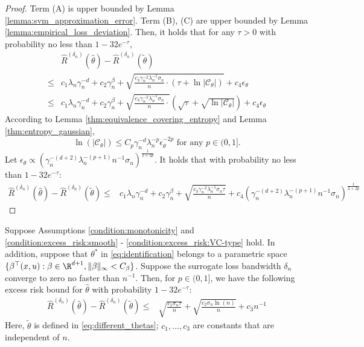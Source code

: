 \begin{proof}
Term (A) is upper bounded by Lemma \ref{lemma:svm_approximation_error}. Term (B), (C) are upper bounded by Lemma \ref{lemma:empirical_loss_deviation}. Then, it holds that for any $\tau>0$ with probability no less than $1-32e^{-\tau}$,
\begin{align*}
   &\widehat R^{({\delta_n})}(\widehat\theta) - \widehat R^{({\delta_n})}(\tilde\theta)\\
   \leq & c_1 \lambda_n\gamma_n^{-d} + c_2\gamma_n^{\beta} + \sqrt{\frac{ c_3\gamma_n^{-2}\lambda_n^{-1}\sigma_n}{n}\cdot\left(\tau +\ln|\mathcal{C}_\theta|\right)} + c_4\epsilon_\theta \\
   \leq & c_1 \lambda_n\gamma_n^{-d} + c_2\gamma_n^{\beta} + \sqrt{\frac{ c_3\gamma_n^{-2}\lambda_n^{-1}\sigma_n}{n}\cdot }\left(\sqrt{\tau} +\sqrt{\ln|\mathcal{C}_\theta|}\right) + c_4\epsilon_\theta
\end{align*}
According to Lemma \ref{thm:equivalence_covering_entropy}  and Lemma \ref{thm:entropy_gaussian}, $$\ln(|\mathcal{C}_\theta|)\leq C_p\gamma_n^{-d}\lambda_n^{-p}\epsilon_\theta^{-2p}\text{ for any }p\in(0,1].$$ 
Let $\epsilon_\theta \propto \left(\gamma_n^{-(d+2)}\lambda_n^{-(p+1)}n^{-1}\sigma_n\right)^{\frac{1}{2+2p}}$. It holds that with probability no less than $1-32e^{-\tau}$:
\begin{align*}
   \widehat R^{({\delta_n})}(\widehat\theta) - \widehat R^{({\delta_n})}(\tilde\theta)\leq & c_1 \lambda_n\gamma_n^{-d} + c_2\gamma_n^{\beta}+ \sqrt{\frac{ c_3\gamma_n^{-2}\lambda_n^{-1}\sigma_n\tau}{n}} + c_4\left(\gamma_n^{-(d+2)}\lambda_n^{-(p+1)}n^{-1}\sigma_n\right)^{\frac{1}{2+2p}} 
\end{align*}
\end{proof}



\begin{lemma}\label{lemma:parametric_estimation_error}
Suppose Assumptions \ref{condition:monotonicity} and \ref{condition:excess_risk:smooth} - \ref{condition:excess_risk:VC-type} hold. In addition, suppose that $\theta^*$ in \eqref{eq:identification} belongs to a parametric space $\{\beta^\top(x,u):\beta\in \R^{d+1},\|\beta\|_{\infty}<C_\beta\}$. Suppose the surrogate loss bandwidth $\delta_n$ converge to zero no faster than $n^{-1}$. Then, for $p\in(0,1]$, we have the following excess risk bound for $\widehat\theta$ with probability $1-32e^{-\tau}$:
   \begin{align*}
    \widehat R^{({\delta_n})}(\widehat\theta) - \widehat R^{({\delta_n})}(\tilde\theta)\leq & \sqrt{\frac{c_1\sigma_n\tau}{n}} + \sqrt{\frac{ c_2\sigma_n\ln(n)}{n}}  + c_3n^{-1}
\end{align*}
Here, $\tilde\theta$ is defined in \eqref{eq:different_thetas}; $c_1,\ldots,c_3$ are constants that are independent of $n$.    
\end{lemma}

